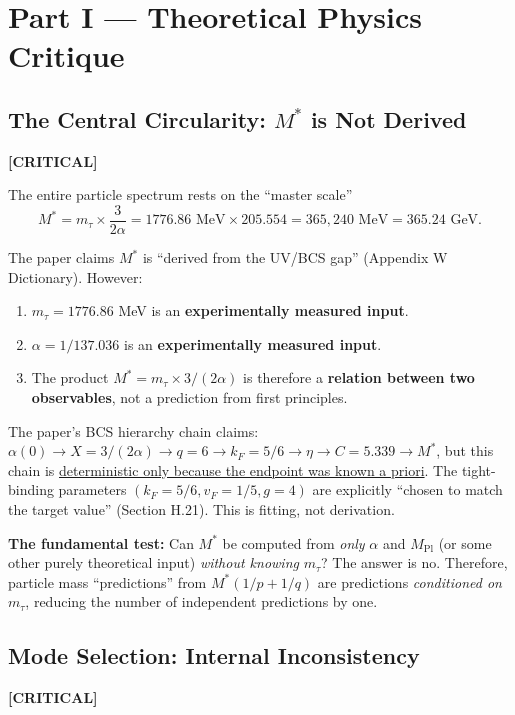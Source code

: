 \documentclass[12pt, a4paper]{article}
\newcommand{\severity}[1]{\textcolor{critical}{\textbf{[CRITICAL]}}}
\begin{document}
\section{Part I --- Theoretical Physics Critique}

\subsection{The Central Circularity: $M^*$ is Not Derived}
\severity{C1}

The entire particle spectrum rests on the ``master scale''
\begin{equation}
    M^* = m_\tau \times \frac{3}{2\alpha} = 1776.86 \text{ MeV} \times 205.554 = 365{,}240 \text{ MeV} = 365.24 \text{ GeV}.
\end{equation}

The paper claims $M^*$ is ``derived from the UV/BCS gap'' (Appendix W Dictionary). However:

\begin{enumerate}
    \item $m_\tau = 1776.86$ MeV is an \textbf{experimentally measured input}.
    \item $\alpha = 1/137.036$ is an \textbf{experimentally measured input}.
    \item The product $M^* = m_\tau \times 3/(2\alpha)$ is therefore a \textbf{relation between two observables}, not a prediction from first principles.
\end{enumerate}

The paper's BCS hierarchy chain claims: $\alpha(0) \to X = 3/(2\alpha) \to q = 6 \to k_F = 5/6 \to \eta \to C = 5.339 \to M^*$, but this chain is \underline{deterministic only because the endpoint was known a priori}. The tight-binding parameters $(k_F = 5/6, v_F = 1/5, g = 4)$ are explicitly ``chosen to match the target value'' (Section H.21). This is fitting, not derivation.

\textbf{The fundamental test:} Can $M^*$ be computed from \emph{only} $\alpha$ and $M_{\text{Pl}}$ (or some other purely theoretical input) \emph{without knowing} $m_\tau$? The answer is no. Therefore, particle mass ``predictions'' from $M^*(1/p + 1/q)$ are predictions \emph{conditioned on} $m_\tau$, reducing the number of independent predictions by one.

\subsection{Mode Selection: Internal Inconsistency}
\severity{C2}
\end{document}
